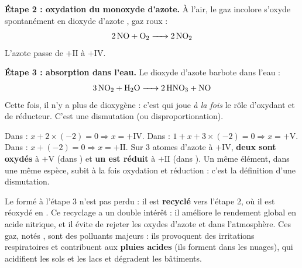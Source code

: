 \documentclass[11pt]{article}
\newcommand{\cle}[1]{{\popxbold\color{popdark}#1}}
\begin{document}
\textbf{Étape 2 : oxydation du monoxyde d'azote.} À l'air, le gaz incolore  s'oxyde spontanément en dioxyde d'azote , gaz roux :
\[ \ce{2 NO + O2 -> 2 NO2} \]
L'azote passe de $+\mathrm{II}$ à $+\mathrm{IV}$.

\textbf{Étape 3 : absorption dans l'eau.} Le dioxyde d'azote barbote dans l'eau :
\[ \ce{3 NO2 + H2O -> 2 HNO3 + NO} \]
Cette fois, il n'y a plus de dioxygène : c'est  qui joue \emph{à la fois} le rôle d'oxydant et de réducteur. C'est une \cle{dismutation} (ou disproportionation).

\begin{exemplebox}
Dans  : $x + 2\times(-2) = 0 \Rightarrow x = +\mathrm{IV}$. Dans  : $1 + x + 3\times(-2) = 0 \Rightarrow x = +\mathrm{V}$. Dans  : $x + (-2) = 0 \Rightarrow x = +\mathrm{II}$. Sur 3 atomes d'azote à $+\mathrm{IV}$, \textbf{deux sont oxydés} à $+\mathrm{V}$ (dans ) et \textbf{un est réduit} à $+\mathrm{II}$ (dans ). Un même élément, dans une même espèce, subit à la fois oxydation et réduction : c'est la définition d'une dismutation.
\end{exemplebox}

\begin{attention}
Le  formé à l'étape 3 n'est pas perdu : il est \textbf{recyclé} vers l'étape 2, où il est réoxydé en . Ce recyclage a un double intérêt : il améliore le rendement global en acide nitrique, et il évite de rejeter les oxydes d'azote  et  dans l'atmosphère. Ces gaz, notés , sont des polluants majeurs : ils provoquent des irritations respiratoires et contribuent aux \textbf{pluies acides} (ils forment  dans les nuages), qui acidifient les sols et les lacs et dégradent les bâtiments.
\end{attention}
\end{document}
